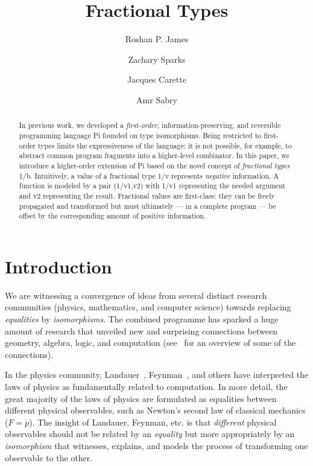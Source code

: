 \documentclass{llncs}
\begin{document}
\title{Fractional Types}
\author{Roshan P. James \and Zachary Sparks \and Jacques Carette \and Amr Sabry}
\maketitle

\begin{abstract}
  In previous work, we developed a \emph{first-order},
  information-preserving, and reversible programming language {{Pi}} founded
  on type isomorphisms. Being restricted to first-order types limits the
  expressiveness of the language: it is not possible, for example, to
  abstract common program fragments into a higher-level combinator. In this
  paper, we introduce a higher-order extension of {{Pi}} based on the novel
  concept of \emph{fractional types} {{1/b}}. Intuitively, a value of a
  fractional type {{1/v}} represents \emph{negative} information. A
  function is modeled by a pair {{(1/v1,v2)}} with {{1/v1}}
  representing the needed argument and {{v2}} representing the
  result. Fractional values are first-class: they can be freely propagated
  and transformed but must ultimately --- in a complete program --- be offset
  by the corresponding amount of positive information.
\end{abstract}

\section{Introduction} 

We are witnessing a convergence of ideas from several distinct research
communities (physics, mathematics, and computer science) towards replacing
\emph{equalities} by \emph{isomorphisms}. The combined programme 
has sparked a huge amount of research that unveiled
new and surprising connections between geometry, algebra, logic, and
computation (see~\cite{baez2011physics} for an overview of some of the 
connections).

In the physics community, Landauer~\cite{Landauer:1961,Landauer},
Feynman~\cite{springerlink:10.1007/BF02650179}, and others have interpreted
the laws of physics as fundamentally related to computation. In more detail,
the great majority of the laws of physics are formulated as equalities
between different physical observables, such as Newton's second law of
classical mechanics ($F=\dot{p}$).
The insight of Landauer, Feynman, etc. is that
\emph{different} physical observables should not be related by an
\emph{equality} but more appropriately by an \emph{isomorphism} that
witnesses, explains, and models the process of transforming one observable to
the other.
\end{document}
